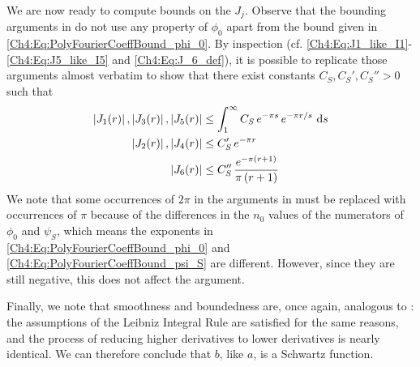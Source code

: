 We are now ready to compute bounds on the $J_j$. Observe that the bounding arguments in  do not use any property of $\phi_0$ apart from the bound given in \eqref{Ch4:Eq:PolyFourierCoeffBound_phi_0}. By inspection (cf. \eqref{Ch4:Eq:J1_like_I1}-\eqref{Ch4:Eq:J5_like_I5} and \eqref{Ch4:Eq:J_6_def}), it is possible to replicate those arguments almost verbatim to show that there exist constants $C_S, C_S', C_S'' > 0$ such that
\begin{align}
    \left\lvert J_1(r) \right\rvert, \left\lvert J_3(r) \right\rvert, \left\lvert J_5(r) \right\rvert &\leq \int_{1}^{\infty} C_S \, e^{-\pi s} \, e^{- \pi r/s} \, \operatorname{d}\!{s} \label{Ch4:Eq:Bound_J1_J5} \\
    \left\lvert J_2(r) \right\rvert, \left\lvert J_4(r) \right\rvert &\leq C_S' \, e^{-\pi r} \label{Ch4:Eq:Bound_J_2} \\
    \left\lvert J_6(r) \right\rvert &\leq C_S'' \, \frac{e^{-\pi\left( r + 1 \right)}}{\pi\left( r + 1 \right)} \label{Ch4:Eq:Bound_J_6}
\end{align}
We note that some occurrences of $2\pi$ in the arguments in  must be replaced with occurrences of $\pi$ because of the differences in the $n_0$ values of the numerators of $\phi_0$ and $\psi_S$, which means the exponents in \eqref{Ch4:Eq:PolyFourierCoeffBound_phi_0} and \eqref{Ch4:Eq:PolyFourierCoeffBound_psi_S} are different. However, since they are still negative, this does not affect the argument.

Finally, we note that smoothness and boundedness are, once again, analogous to : the assumptions of the Leibniz Integral Rule are satisfied for the same reasons, and the process of reducing higher derivatives to lower derivatives is nearly identical. We can therefore conclude that $b$, like $a$, is a Schwartz function.